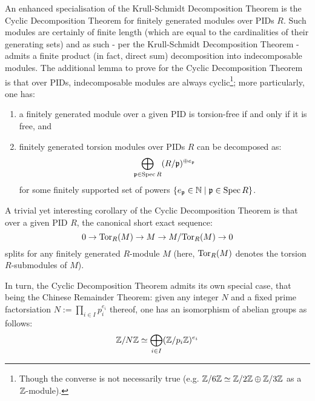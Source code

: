             \begin{example} \label{example: cyclic_decomposition_theorem_for_finitely_generated_modules_over_PIDs}
                An enhanced specialisation of the Krull-Schmidt Decomposition Theorem is the Cyclic Decomposition Theorem for finitely generated modules over PIDs $R$. Such modules are certainly of finite length (which are equal to the cardinalities of their generating sets) and as such - per the Krull-Schmidt Decomposition Theorem - admits a finite product (in fact, direct sum) decomposition into indecomposable modules. The additional lemma to prove for the Cyclic Decomposition Theorem is that over PIDs, indecomposable modules are always cyclic\footnote{Though the converse is not necessarily true (e.g. $\mathbb{Z}/6\mathbb{Z} \simeq \mathbb{Z}/2\mathbb{Z} \oplus \mathbb{Z}/3\mathbb{Z}$ as a $\mathbb{Z}$-module).}; more particularly, one has:
                    \begin{enumerate}
                        \item a finitely generated module over a given PID is torsion-free if and only if it is free, and 
                        \item finitely generated torsion modules over PIDs $R$ can be decomposed as:
                            $$\bigoplus_{\mathfrak{p} \in \operatorname{Spec} R} (R/\mathfrak{p})^{\oplus e_{\mathfrak{p}}}$$
                        for some finitely supported set of powers $\{e_{\mathfrak{p}} \in \mathbb{N} \mid \mathfrak{p} \in \operatorname{Spec} R\}$.
                    \end{enumerate}
                
                A trivial yet interesting corollary of the Cyclic Decomposition Theorem is that over a given PID $R$, the canonical short exact sequence:
                    $$0 \to \mathrm{Tor}_R(M) \to M \to M/\mathrm{Tor}_R(M) \to 0$$
                splits for any finitely generated $R$-module $M$ (here, $\mathrm{Tor}_R(M)$ denotes the torsion $R$-submodules of $M$).
                
                In turn, the Cyclic Decomposition Theorem admits its own special case, that being the Chinese Remainder Theorem: given any integer $N$ and a fixed prime factorsiation $N := \prod_{i \in I} p_i^{e_i}$ thereof, one has an isomorphism of abelian groups as follows:
                    $$\mathbb{Z}/N\mathbb{Z} \simeq \bigoplus_{i \in I} (\mathbb{Z}/p_i\mathbb{Z})^{e_i}$$
            \end{example}
            
